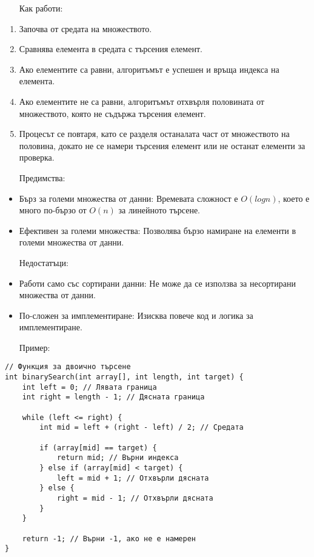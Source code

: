 \documentclass[oneside]{book}
\begin{document}
\begin{enumerate}\item[Как работи:]\end{enumerate}
\begin{enumerate}
    \item Започва от средата на множеството.
    \item Сравнява елемента в средата с търсения елемент.
    \item Ако елементите са равни, алгоритъмът е успешен и връща индекса на елемента.
    \item Ако елементите не са равни, алгоритъмът отхвърля половината от множеството, която не съдържа търсения елемент.
    \item Процесът се повтаря, като се разделя останалата част от множеството на половина, докато не се намери търсения елемент или не останат елементи за проверка.
\end{enumerate}

\begin{itemize}\item[Предимства:]\end{itemize}
\begin{itemize}
    \item Бърз за големи множества от данни: Времевата сложност е $O(log n)$, което е много по-бързо от $O(n)$ за линейното търсене.
    \item Ефективен за големи множества: Позволява бързо намиране на елементи в големи множества от данни.
\end{itemize}

\begin{itemize}\item[Недостатъци:]\end{itemize}
\begin{itemize}
    \item Работи само със сортирани данни: Не може да се използва за несортирани множества от данни.
    \item По-сложен за имплементиране: Изисква повече код и логика за имплементиране.
\end{itemize}

\begin{itemize}\item[Пример:]\end{itemize}
\begin{mdframed}\begin{lstlisting}
// Функция за двоично търсене
int binarySearch(int array[], int length, int target) {
    int left = 0; // Лявата граница
    int right = length - 1; // Дясната граница

    while (left <= right) {
        int mid = left + (right - left) / 2; // Средата

        if (array[mid] == target) {
            return mid; // Върни индекса
        } else if (array[mid] < target) {
            left = mid + 1; // Отхвърли дясната
        } else {
            right = mid - 1; // Отхвърли дясната
        }
    }

    return -1; // Върни -1, ако не е намерен
}
\end{lstlisting}\end{mdframed}
\end{document}

